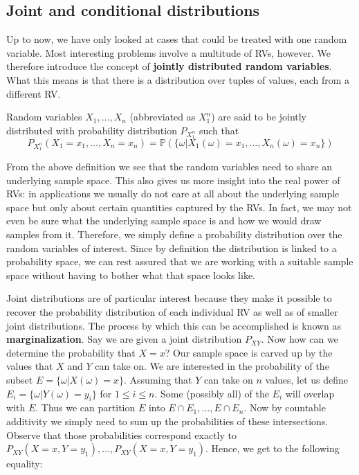 \documentclass[a4paper,11pt,leqno]{report}
\begin{document}
\begin{Definition}
\section{Joint and conditional distributions}

Up to now, we have only looked at cases that could be treated with one random variable. Most interesting problems involve a multitude
of RVs, however. We therefore introduce the concept of \textbf{jointly distributed random variables}. What this means is that
there is a distribution over tuples of values, each from a different RV.

\begin{Definition}
Random variables $ X_{1}, \ldots, X_{n} $ (abbreviated as $ X^{n}_{1} $) 
are said to be jointly distributed with probability distribution $ P_{X_{1}^{n}} $ such that
$$ P_{X^{n}_{1}}(X_{1}=x_{1}, \ldots, X_{n}=x_{n}) = \mathbb{P}(\{\omega|X_{1}(\omega) = x_{1}, \ldots, X_{n}(\omega)=x_{n}\}) $$
\end{Definition}

From the above definition we see that the random variables need to share an underlying sample space. This also gives us more
insight into the real power of RVs: in applications we usually do not care at all about the underlying sample space but only about
certain quantities captured by the RVs. In fact, we may not even be sure what the underlying sample space is and how we would
draw samples from it. Therefore, we simply define a probability distribution over the random variables of interest. Since by definition
the distribution is linked to a probability space, we can rest assured that we are working with a suitable sample space without
having to bother what that space looks like.

Joint distributions are of particular interest because they make it possible to recover the probability distribution of each individual
RV as well as of smaller joint distributions. The process by which this can be accomplished is known as \textbf{marginalization}. Say
we are given a joint distribution $ P_{XY} $. Now how can we determine the probability that $ X=x $? Our sample space is carved
up by the values that $ X $ and $ Y $ can take on. We are interested in the probability of the subset $ E = \{\omega|X(\omega)=x\} $.
Assuming that $ Y $ can take on $ n $ values, let us define $ E_{i} = \{\omega| Y(\omega) = y_{i}\} $ for $ 1 \leq i \leq n $.
Some (possibly all) of the $ E_{i} $ will overlap with $ E $. Thus we can partition $ E $ into $ E\cap E_{1}, \ldots, E \cap E_{n} $.
Now by countable additivity we simply need to sum up the probabilities of these intersections. Observe that those probabilities
correspond exactly to $ P_{XY}(X=x,Y=y_{1}), \ldots, P_{XY}(X=x,Y=y_{1}) $. Hence, we get to the following equality:


\end{Definition}
\end{document}
